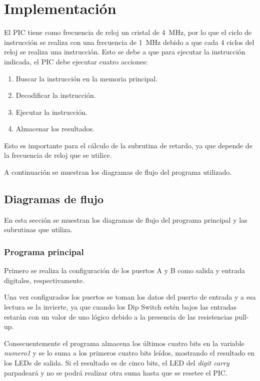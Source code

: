 \documentclass[12pt,a4paper]{article}
\begin{document}
	

\newpage
\section{Implementación}
	El PIC tiene como frecuencia de reloj un cristal de \SI{4}{\MHz}, por lo que el ciclo de instrucción se realiza con una frecuencia de \SI{1}{\MHz} debido a que cada 4 ciclos del reloj se realiza una instrucción. Esto se debe a que para ejecutar la instrucción indicada, el PIC debe ejecutar cuatro acciones: 
	
	\begin{enumerate}[leftmargin=1.5cm,nosep]
	\item Buscar la instrucción en la memoria principal.
	\item Decodificar la instrucción.
	\item Ejecutar la instrucción.
	\item Almacenar los resultados.
	\end{enumerate}
	
	Esto es importante para el cálculo de la subrutina de retardo, ya que depende de la frecuencia de reloj que se utilice.
	
	A continuación se muestran los diagramas de flujo del programa utilizado.
	
\subsection{Diagramas de flujo}
	En esta sección se muestran los diagramas de flujo del programa principal y las subrutinas que utiliza.
	
	\subsubsection{Programa principal}	
	Primero se realiza la configuración de los puertos A y B como salida y entrada digitales, respectivamente. 
	
	Una vez configurados los puertos se toman los datos del puerto de entrada y a esa lectura se la invierte, ya que cuando los Dip Switch estén bajos las entradas estarán con un valor de uno lógico debido a la presencia de las resistencias pull-up.
	
	Consecuentemente el programa almacena los últimos cuatro bits en la variable \emph{numero1} y se lo suma a los primeros cuatro bits leídos, mostrando el resultado en los LEDs de salida. Si el resultado es de cinco bits, el LED del \emph{digit carry} parpadeará y no se podrá realizar otra suma hasta que se resetee el PIC.
	
\end{document}
